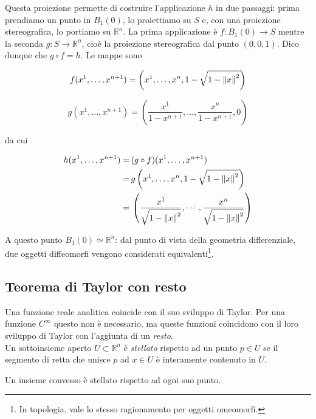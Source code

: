 Questa proiezione permette di costruire l'applicazione $ h $ in due passaggi: prima prendiamo un punto in $ B_{1}(0) $, lo proiettiamo su $ S $ e, con una proiezione stereografica, lo portiamo su $ \mathbb{R}^{n} $. La prima applicazione è $ f : B_{1}(0) \to S $ mentre la seconda $ g : S \to \mathbb{R}^{n} $, cioè la proiezione stereografica dal punto $ (0,0,1) $. Dico dunque che $ g \circ f = h $. Le mappe sono

\begin{equation}
	f (x^{1},\dots,x^{n+1}) = \left( x^{1},\dots,x^{n},1-\sqrt{1-\norm{x}^{2}} \right)
\end{equation}

\begin{equation}
	g (x^{1},\dots,x^{n+1}) = \left( \dfrac{x^{1}}{1-x^{n+1}},\dots,\dfrac{x^{n}}{1-x^{n+1}},0 \right)
\end{equation}

da cui

\begin{align}
	\begin{split}
		h (x^{1},\dots,x^{n+1}) =& \, (g \circ f) (x^{1},\dots,x^{n+1})\\
		=& \, g \left( x^{1},\dots,x^{n},1-\sqrt{1-\norm{x}^{2}} \right)\\
		=& \, \left( \dfrac{x^{1}}{\sqrt{1 - \norm{x}^{2}}}, \cdots, \dfrac{x^{n}}{\sqrt{1 - \norm{x}^{2}}} \right)
	\end{split}
\end{align}

A questo punto $ B_{1} (0) \simeq \mathbb{R}^{n} $: dal punto di vista della geometria differenziale, due oggetti diffeomorfi vengono considerati equivalenti\footnote{%
	In topologia, vale lo stesso ragionamento per oggetti omeomorfi.}.

\subsection{Teorema di Taylor con resto}

Una funzione reale analitica coincide con il suo sviluppo di Taylor. Per una funzione $ C^{\infty} $ questo non è necessario, ma queste funzioni coincidono con il loro sviluppo di Taylor con l'aggiunta di un \textit{resto}.\\
Un sottoinsieme aperto $ U \subset \mathbb{R}^{n} $ è \textit{stellato} rispetto ad un punto $ p \in U $ se il segmento di retta che unisce $ p $ ad $ x \in U $ è interamente contenuto in $ U $.

\begin{remark}
	Un insieme convesso è stellato rispetto ad ogni suo punto.
\end{remark}

